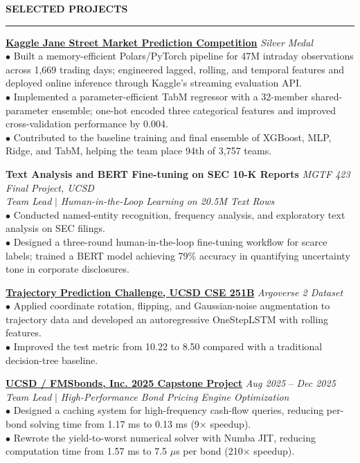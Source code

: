 \documentclass{../original_CV/resume}
\renewcommand{\sectionskip}{\vspace{0.10cm}}
\renewcommand{\sectionlineskip}{\vspace{0.10cm}}
\renewenvironment{rSection}[1]{
\sectionskip
\textcolor{UC San Diego Blue}{\textbf{\large\bfseries\MakeUppercase{#1}}}
\sectionlineskip
\hrule
\begin{list}{}{\setlength{\leftmargin}{0em}}
\item[]
}{\end{list}}
\begin{document}
\begin{rSection}{SELECTED PROJECTS}
\noindent
\href{https://github.com/YuankaiTao-super/Kaggle2024-Jane-Street-Real-Time-Market-Data-Forecasting}{\textbf{Kaggle Jane Street Market Prediction Competition}} \hfill \textit{Silver Medal}\\
$\bullet$ Built a memory-efficient Polars/PyTorch pipeline for 47M intraday observations across 1,669 trading days; engineered lagged, rolling, and temporal features and deployed online inference through Kaggle's streaming evaluation API.\\[1.5pt]
$\bullet$ Implemented a parameter-efficient TabM regressor with a 32-member shared-parameter ensemble; one-hot encoded three categorical features and improved cross-validation performance by 0.004.\\[1.5pt]
$\bullet$ Contributed to the baseline training and final ensemble of XGBoost, MLP, Ridge, and TabM, helping the team place 94th of 3,757 teams.

\noindent
\textbf{Text Analysis and BERT Fine-tuning on SEC 10-K Reports} \hfill \textit{MGTF 423 Final Project, UCSD}\\
\textit{Team Lead} $|$ \textit{Human-in-the-Loop Learning on 20.5M Text Rows}\\[3pt]
$\bullet$ Conducted named-entity recognition, frequency analysis, and exploratory text analysis on SEC filings.\\[1.5pt]
$\bullet$ Designed a three-round human-in-the-loop fine-tuning workflow for scarce labels; trained a BERT model achieving 79\% accuracy in quantifying uncertainty tone in corporate disclosures.

\noindent
\href{https://github.com/YuankaiTao-super/CSE-251B-Final-Project}{\textbf{Trajectory Prediction Challenge, UCSD CSE 251B}} \hfill \textit{Argoverse 2 Dataset}\\
$\bullet$ Applied coordinate rotation, flipping, and Gaussian-noise augmentation to trajectory data and developed an autoregressive OneStepLSTM with rolling features.\\[1.5pt]
$\bullet$ Improved the test metric from 10.22 to 8.50 compared with a traditional decision-tree baseline.

\noindent
\href{https://github.com/YuankaiTao-super/Capstone_FMS_2025}{\textbf{UCSD / FMSbonds, Inc. 2025 Capstone Project}} \hfill {\em Aug 2025} -- {\em Dec 2025}\\
\textit{Team Lead} $|$ \textit{High-Performance Bond Pricing Engine Optimization}\\[3pt]
$\bullet$ Designed a caching system for high-frequency cash-flow queries, reducing per-bond solving time from 1.17 ms to 0.13 ms (9$\times$ speedup).\\[1.5pt]
$\bullet$ Rewrote the yield-to-worst numerical solver with Numba JIT, reducing computation time from 1.57 ms to 7.5 $\mu$s per bond (210$\times$ speedup).
\end{rSection}
\end{document}
